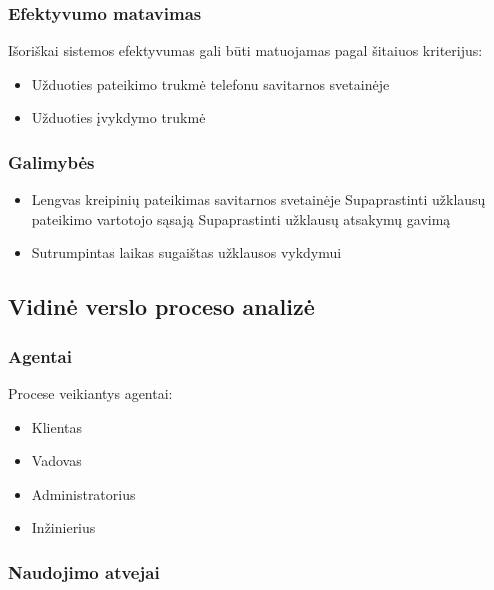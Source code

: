 		\subsubsection{Efektyvumo matavimas}
		
			Išoriškai sistemos efektyvumas gali būti matuojamas pagal šitaiuos kriterijus:
			\begin{itemize}
				\item Užduoties pateikimo trukmė
					\subitem telefonu
					\subitem savitarnos svetainėje
				\item Užduoties įvykdymo trukmė
			\end{itemize}

		\subsubsection{Galimybės}

			\begin{itemize}
				\item Lengvas kreipinių pateikimas savitarnos svetainėje
					\subitem Supaprastinti užklausų pateikimo vartotojo sąsają
					\subitem Supaprastinti užklausų atsakymų gavimą
				\item Sutrumpintas laikas sugaištas užklausos vykdymui
			\end{itemize}

	\subsection{Vidinė verslo proceso analizė}

		\subsubsection{Agentai}
		
			Procese veikiantys agentai:
			\begin{itemize}
				\item Klientas
				\item Vadovas
				\item Administratorius
				\item Inžinierius
			\end{itemize}

		\subsubsection{Naudojimo atvejai}

